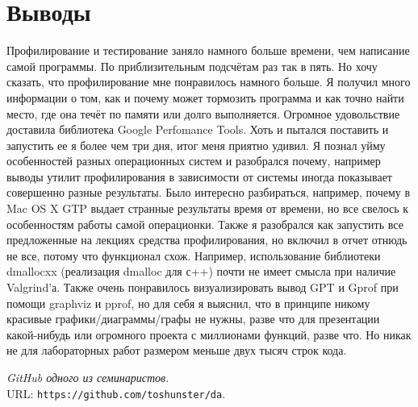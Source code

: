 \documentclass[pdf, unicode, 12pt, a4paper,oneside,fleqn]{article}
\begin{document}
\section{Выводы}
Профилирование и тестирование заняло намного больше времени, чем написание самой программы. По приблизительным подсчётам раз так в пять. Но хочу сказать, что профилирование мне понравилось намного больше. Я получил много информации о том, как и почему может тормозить программа и как точно найти место, где она течёт по памяти или долго выполняется. Огромное удовольствие доставила библиотека Google Perfomance Tools. Хоть и пытался поставить и запустить ее я более чем три дня, итог меня приятно удивил. Я познал уйму особенностей разных операционных систем и разобрался почему, например выводы утилит профилирования в зависимости от системы иногда показывает совершенно разные результаты. Было интересно разбираться, например, почему в Mac OS X GTP выдает странные результаты время от времени, но все свелось к особенностям работы самой операционки. Также я разобрался как запустить все предложенные на лекциях средства профилирования, но включил в отчет отнюдь не все, потому что функционал схож. Например, использование библиотеки dmallocxx (реализация dmalloc для с++) почти не имеет смысла при наличие Valgrind'а. Также очень понравилось визуализировать вывод GPT и Gprof при помощи graphviz и pprof, но для себя я выяснил, что в принципе никому красивые графики/диаграммы/графы не нужны, разве что для презентации какой-нибудь или огромного проекта с миллионами функций, разве что. Но никак не для лабораторных работ размером меньше двух тысяч строк кода.
\pagebreak
\begin{thebibliography}{99}
{\itshape GitHub одного из семинаристов.} \\URL: \texttt{https://github.com/toshunster/da}. 
\end{thebibliography}
\end{document}
